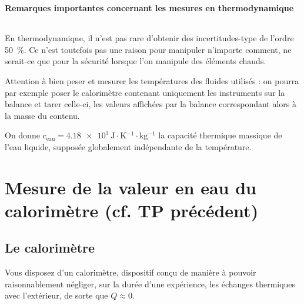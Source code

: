 \documentclass[a4paper,french,bookmarks]{article}
\begin{document}


\text{}\hfill\\

\textbf{Remarques importantes concernant les mesures en thermodynamique}
\hfill
%
\begin{minipage}{0.35\linewidth}
	\centering
	\begin{tabular}{c|c}
	\end{tabular}
\end{minipage}
%
\begin{enumerate}
    \itt En thermodynamique, il n'est pas rare d'obtenir des incertitudes-type de l'ordre \SI{50}{\percent}. Ce n'est toutefois pas une raison pour manipuler n'importe comment, ne serait-ce que pour la sécurité lorsque l'on manipule des éléments chauds.
    
    \itt Attention à bien peser et mesurer les températures des fluides utilisés : on pourra par exemple poser le calorimètre contenant uniquement les instruments sur la balance et tarer celle-ci, les valeurs affichées par la balance correspondant alors à la masse du contenu.
\end{enumerate}

On donne $c_\text{eau} = \SI{4.18e3}{\joule \cdot \K^{-1} \cdot \kg^{-1}}$ la capacité thermique massique de l'eau liquide, supposée globalement indépendante de la température.


\section{Mesure de la valeur en eau du calorimètre (cf. TP précédent)}

\subsection{Le calorimètre}

Vous disposez d'un calorimètre, dispositif conçu de manière à pouvoir raisonnablement négliger, sur la durée d'une expérience, les échanges thermiques avec l'extérieur, de sorte que $Q \approx 0$.
\end{document}

